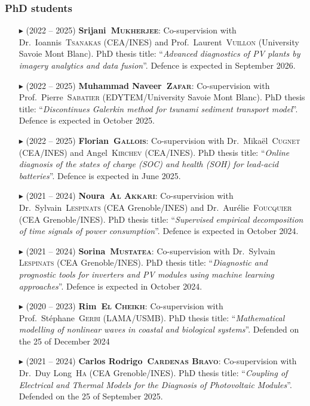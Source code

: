         \separator
        \subsubsection{PhD students}
        \begin{itemize}
            \item[$\blacktriangleright$] (2022 -- 2025) \textbf{Srijani~\textsc{Mukherjee}}: Co-supervision with Dr.~Ioannis~\textsc{Tsanakas} (CEA/INES) and Prof.~Laurent~\textsc{Vuillon} (University Savoie Mont Blanc). PhD thesis title: ``\textit{Advanced diagnostics of PV plants by imagery analytics and data fusion}''. Defence is expected in September 2026.
            \item[$\blacktriangleright$] (2022 -- 2025) \textbf{Muhammad Naveer~\textsc{Zafar}}: Co-supervision with Prof.~Pierre~\textsc{Sabatier} (EDYTEM/University Savoie Mont Blanc). PhD thesis title: ``\textit{Discontinues Galerkin method for tsunami sediment transport model}''. Defence is expected in October 2025.
            \item[$\blacktriangleright$] (2022 -- 2025) \textbf{Florian~\textsc{Gallois}}: Co-supervision with Dr.~Mika\"el~\textsc{Cugnet} (CEA/INES) and Angel~\textsc{Kirchev} (CEA/INES). PhD thesis title: ``\textit{Online diagnosis of the states of charge (SOC) and health (SOH) for lead-acid batteries}''. Defence is expected in June 2025.
            \item[$\blacktriangleright$] (2021 -- 2024) \textbf{Noura~\textsc{Al Akkari}}: Co-supervision with Dr.~Sylvain~\textsc{Lespinats} (CEA Grenoble/INES) and Dr.~Aur\'elie~\textsc{Foucquier} (CEA Grenoble/INES). PhD thesis title: ``\textit{Supervised empirical decomposition of time signals of power consumption}''. Defence is expected in October 2024.
            \item[$\blacktriangleright$] (2021 -- 2024) \textbf{Sorina~\textsc{Mustatea}}: Co-supervision with Dr.~Sylvain \textsc{Lespinats} (CEA Grenoble/INES). PhD thesis title: ``\textit{Diagnostic and prognostic tools for inverters and PV modules using machine learning approaches}''. Defence is expected in October 2024.
            \item[$\blacktriangleright$] (2020 -- 2023) \textbf{Rim~\textsc{El Cheikh}}: Co-supervision with Prof.~St\'ephane~\textsc{Gerbi} (LAMA/USMB). PhD thesis title: ``\textit{Mathematical modelling of nonlinear waves in coastal and biological systems}''. Defended on the 25 of December 2024
            \item[$\blacktriangleright$] (2021 -- 2024) \textbf{Carlos Rodrigo~\textsc{Cardenas Bravo}}: Co-supervision with Dr.~Duy Long~\textsc{Ha} (CEA Grenoble/INES). PhD thesis title: ``\textit{Coupling of Electrical and Thermal Models for the Diagnosis of Photovoltaic Modules}''. Defended on the 25 of September 2025.

\end{itemize}
